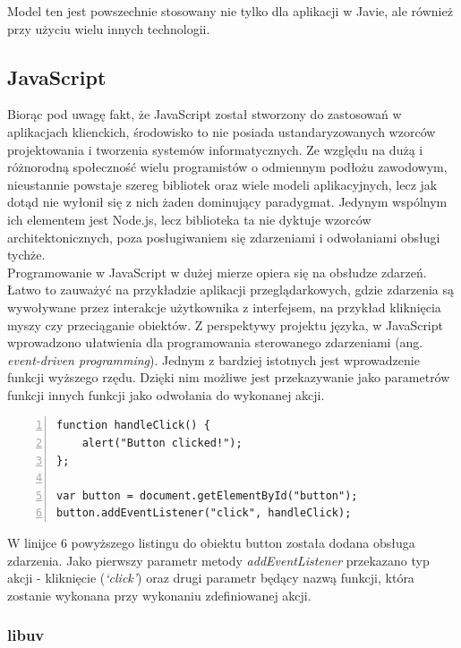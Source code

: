 \documentclass[12pt,twoside]{article}
\begin{document}
Model ten jest powszechnie stosowany nie tylko dla aplikacji w Javie,
ale również przy użyciu wielu innych technologii.
\autocite{eisele2015modern, jendrock2014jee}

\subsection{JavaScript}\label{architektura---javascript}

Biorąc pod uwagę fakt, że JavaScript został stworzony do zastosowań w
aplikacjach klienckich, środowisko to nie posiada ustandaryzowanych
wzorców projektowania i tworzenia systemów informatycznych. Ze względu
na dużą i różnorodną społeczność wielu programistów o odmiennym podłożu
zawodowym, nieustannie powstaje szereg bibliotek oraz wiele modeli
aplikacyjnych, lecz jak dotąd nie wyłonił się z nich żaden dominujący
paradygmat. Jedynym wspólnym ich elementem jest Node.js, lecz biblioteka
ta nie dyktuje wzorców architektonicznych, poza posługiwaniem się
zdarzeniami i odwołaniami obsługi tychże.\\
Programowanie w JavaScript w dużej mierze opiera się na obsłudze
zdarzeń. Łatwo to zauważyć na przykładzie aplikacji przeglądarkowych,
gdzie zdarzenia są wywoływane przez interakcje użytkownika z
interfejsem, na przykład kliknięcia myszy czy przeciąganie obiektów. Z
perspektywy projektu języka, w JavaScript wprowadzono ułatwienia dla
programowania sterowanego zdarzeniami (ang. \emph{event-driven
programming}). Jednym z bardziej istotnych jest wprowadzenie funkcji
wyższego rzędu. Dzięki nim możliwe jest przekazywanie jako parametrów
funkcji innych funkcji jako odwołania do wykonanej akcji.

\begin{lstlisting}[numbers=left, caption=Obsługa zdarzeń kliknięcia]
function handleClick() {
    alert("Button clicked!");
};

var button = document.getElementById("button");
button.addEventListener("click", handleClick);
\end{lstlisting}

W linijce 6 powyższego listingu do obiektu button została dodana obsługa
zdarzenia. Jako pierwszy parametr metody \emph{addEventListener}
przekazano typ akcji - kliknięcie (\emph{`click'}) oraz drugi parametr
będący nazwą funkcji, która zostanie wykonana przy wykonaniu
zdefiniowanej akcji.

\subsubsection{libuv}\label{libuv}
\end{document}
